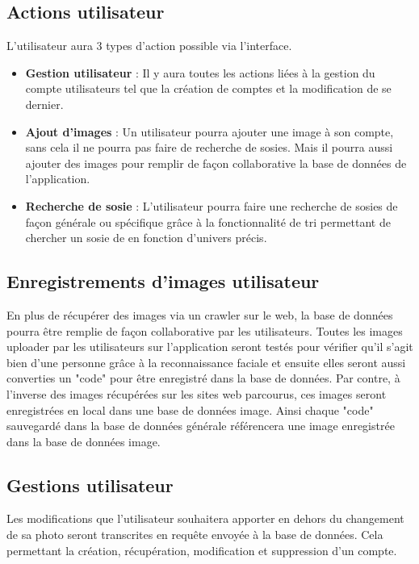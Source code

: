 \documentclass[a4paper,12pt]{article}
\begin{document}
 \subsection{Actions utilisateur}
 L'utilisateur aura 3 types d'action possible via l'interface. 
 \begin{itemize}
     \item \textbf{Gestion utilisateur} : Il y aura toutes les actions liées à la gestion du compte utilisateurs tel que la création de comptes et la modification de se dernier. 
     \item \textbf{Ajout d'images} : Un utilisateur pourra ajouter une image à son compte, sans cela il ne pourra pas faire de recherche de sosies. Mais il pourra aussi ajouter des images pour remplir de façon collaborative la base de données de l'application. 
     \item \textbf{Recherche de sosie} : L'utilisateur pourra faire une recherche de sosies de façon générale ou spécifique grâce à la fonctionnalité de tri permettant de chercher un sosie de en fonction d'univers précis. 
 \end{itemize}
 \subsection{Enregistrements d'images utilisateur}
 En plus de récupérer des images via un crawler sur le web, la base de données pourra être remplie de façon collaborative par les utilisateurs. Toutes les images uploader par les utilisateurs sur l'application seront testés pour vérifier qu'il s'agit bien d'une personne grâce à la reconnaissance faciale et ensuite elles seront aussi converties un "code" pour être enregistré dans la base de données. Par contre, à l'inverse des images récupérées sur les sites web parcourus, ces images seront enregistrées en local dans une base de données image. Ainsi chaque "code" sauvegardé dans la base de données générale référencera une image enregistrée dans la base de données image. 
 \subsection{Gestions utilisateur}
 Les modifications que l'utilisateur souhaitera apporter en dehors du changement de sa photo seront transcrites en requête envoyée à la base de données.  Cela permettant la création, récupération, modification et suppression d'un compte. 
\end{document}
